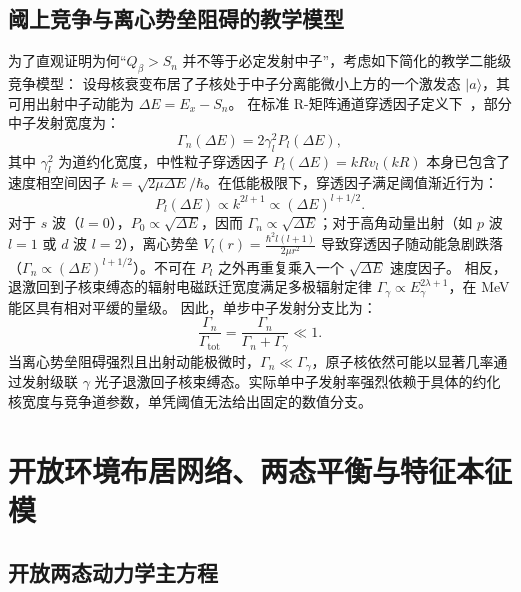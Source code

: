\subsection{阈上竞争与离心势垒阻碍的教学模型}

为了直观证明为何“$Q_\beta > S_n$ 并不等于必定发射中子”，考虑如下简化的教学二能级竞争模型：
设母核衰变布居了子核处于中子分离能微小上方的一个激发态 $|a\rangle$，其可用出射中子动能为 $\Delta E = E_x - S_n$。
在标准 R-矩阵通道穿透因子定义下~\cite{book-bertulani-nuclear-reactions}，部分中子发射宽度为：
\begin{equation}\label{eq:appD-neutron-width-scaling}
\Gamma_n(\Delta E) = 2 \gamma_l^2 P_l(\Delta E),
\end{equation}
其中 $\gamma_l^2$ 为道约化宽度，中性粒子穿透因子 $P_l(\Delta E) = k R v_l(k R)$ 本身已包含了速度相空间因子 $k = \sqrt{2\mu \Delta E}/\hbar$。在低能极限下，穿透因子满足阈值渐近行为：
\begin{equation}\label{eq:appD-centrifugal-suppression}
P_l(\Delta E) \propto k^{2l+1} \propto (\Delta E)^{l + 1/2}.
\end{equation}
对于 $s$ 波（$l=0$），$P_0 \propto \sqrt{\Delta E}$，因而 $\Gamma_n \propto \sqrt{\Delta E}$；对于高角动量出射（如 $p$ 波 $l=1$ 或 $d$ 波 $l=2$），离心势垒 $V_l(r) = \frac{\hbar^2 l(l+1)}{2\mu r^2}$ 导致穿透因子随动能急剧跌落（$\Gamma_n \propto (\Delta E)^{l+1/2}$）。不可在 $P_l$ 之外再重复乘入一个 $\sqrt{\Delta E}$ 速度因子。
相反，退激回到子核束缚态的辐射电磁跃迁宽度满足多极辐射定律 $\Gamma_\gamma \propto E_\gamma^{2\lambda + 1}$，在 MeV 能区具有相对平缓的量级。
因此，单步中子发射分支比为：
\begin{equation}\label{eq:appD-branch-competition}
\frac{\Gamma_n}{\Gamma_{\mathrm{tot}}} = \frac{\Gamma_n}{\Gamma_n + \Gamma_\gamma} \ll 1.
\end{equation}
当离心势垒阻碍强烈且出射动能极微时，$\Gamma_n \ll \Gamma_\gamma$，原子核依然可能以显著几率通过发射级联 $\gamma$ 光子退激回子核束缚态。实际单中子发射率强烈依赖于具体的约化核宽度与竞争道参数，单凭阈值无法给出固定的数值分支。

\section{开放环境布居网络、两态平衡与特征本征模}\label{sec:appD-open-network}

\subsection{开放两态动力学主方程}

